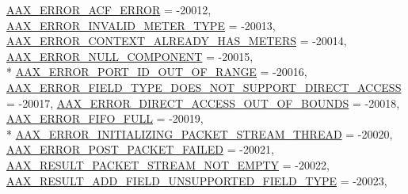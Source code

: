 \begin{DoxyCompactItemize}
\hyperlink{a00207_a5f8c7439f3a706c4f8315a9609811937a849098e78783b5d82562b27b95a14777}{A\+A\+X\+\_\+\+E\+R\+R\+O\+R\+\_\+\+A\+C\+F\+\_\+\+E\+R\+R\+O\+R} = -\/20012, 
\hyperlink{a00207_a5f8c7439f3a706c4f8315a9609811937ae0c64c5bc8555e28c8b1292797751bf2}{A\+A\+X\+\_\+\+E\+R\+R\+O\+R\+\_\+\+I\+N\+V\+A\+L\+I\+D\+\_\+\+M\+E\+T\+E\+R\+\_\+\+T\+Y\+P\+E} = -\/20013, 
\hyperlink{a00207_a5f8c7439f3a706c4f8315a9609811937a05d8b2e9843c1e3b46beec5ed384428a}{A\+A\+X\+\_\+\+E\+R\+R\+O\+R\+\_\+\+C\+O\+N\+T\+E\+X\+T\+\_\+\+A\+L\+R\+E\+A\+D\+Y\+\_\+\+H\+A\+S\+\_\+\+M\+E\+T\+E\+R\+S} = -\/20014, 
\hyperlink{a00207_a5f8c7439f3a706c4f8315a9609811937a68d2d3b24eab398fa95b64b87590995f}{A\+A\+X\+\_\+\+E\+R\+R\+O\+R\+\_\+\+N\+U\+L\+L\+\_\+\+C\+O\+M\+P\+O\+N\+E\+N\+T} = -\/20015, 
\\*
\hyperlink{a00207_a5f8c7439f3a706c4f8315a9609811937a288a89626f746bb5fe73d1e64afe495c}{A\+A\+X\+\_\+\+E\+R\+R\+O\+R\+\_\+\+P\+O\+R\+T\+\_\+\+I\+D\+\_\+\+O\+U\+T\+\_\+\+O\+F\+\_\+\+R\+A\+N\+G\+E} = -\/20016, 
\hyperlink{a00207_a5f8c7439f3a706c4f8315a9609811937aa3ee2974297fb823956900fd6294975d}{A\+A\+X\+\_\+\+E\+R\+R\+O\+R\+\_\+\+F\+I\+E\+L\+D\+\_\+\+T\+Y\+P\+E\+\_\+\+D\+O\+E\+S\+\_\+\+N\+O\+T\+\_\+\+S\+U\+P\+P\+O\+R\+T\+\_\+\+D\+I\+R\+E\+C\+T\+\_\+\+A\+C\+C\+E\+S\+S} = -\/20017, 
\hyperlink{a00207_a5f8c7439f3a706c4f8315a9609811937a551ea12047b22ba001765454b103a779}{A\+A\+X\+\_\+\+E\+R\+R\+O\+R\+\_\+\+D\+I\+R\+E\+C\+T\+\_\+\+A\+C\+C\+E\+S\+S\+\_\+\+O\+U\+T\+\_\+\+O\+F\+\_\+\+B\+O\+U\+N\+D\+S} = -\/20018, 
\hyperlink{a00207_a5f8c7439f3a706c4f8315a9609811937a645af19cfe6722009b826f78fda4517c}{A\+A\+X\+\_\+\+E\+R\+R\+O\+R\+\_\+\+F\+I\+F\+O\+\_\+\+F\+U\+L\+L} = -\/20019, 
\\*
\hyperlink{a00207_a5f8c7439f3a706c4f8315a9609811937ad7177dc54f7d14ee9acc3a965664fc01}{A\+A\+X\+\_\+\+E\+R\+R\+O\+R\+\_\+\+I\+N\+I\+T\+I\+A\+L\+I\+Z\+I\+N\+G\+\_\+\+P\+A\+C\+K\+E\+T\+\_\+\+S\+T\+R\+E\+A\+M\+\_\+\+T\+H\+R\+E\+A\+D} = -\/20020, 
\hyperlink{a00207_a5f8c7439f3a706c4f8315a9609811937a9230db9af40b4401d17d2f597e75adca}{A\+A\+X\+\_\+\+E\+R\+R\+O\+R\+\_\+\+P\+O\+S\+T\+\_\+\+P\+A\+C\+K\+E\+T\+\_\+\+F\+A\+I\+L\+E\+D} = -\/20021, 
\hyperlink{a00207_a5f8c7439f3a706c4f8315a9609811937a400d9332b820436d544b658523dacbf0}{A\+A\+X\+\_\+\+R\+E\+S\+U\+L\+T\+\_\+\+P\+A\+C\+K\+E\+T\+\_\+\+S\+T\+R\+E\+A\+M\+\_\+\+N\+O\+T\+\_\+\+E\+M\+P\+T\+Y} = -\/20022, 
\hyperlink{a00207_a5f8c7439f3a706c4f8315a9609811937a3820695c507c18cef39a7cf8972e468b}{A\+A\+X\+\_\+\+R\+E\+S\+U\+L\+T\+\_\+\+A\+D\+D\+\_\+\+F\+I\+E\+L\+D\+\_\+\+U\+N\+S\+U\+P\+P\+O\+R\+T\+E\+D\+\_\+\+F\+I\+E\+L\+D\+\_\+\+T\+Y\+P\+E} = -\/20023, 

\end{DoxyCompactItemize}

